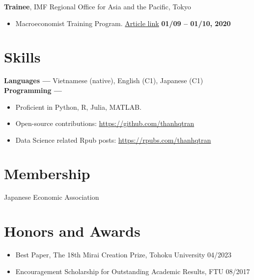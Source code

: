 \documentclass[margin,line]{res}
\begin{document}
\begin{resume}
\vspace*{.05in}
{\bf Trainee}, IMF Regional Office for Asia and the Pacific, Tokyo
\vspace*{.05in}
\begin{itemize}
\item[ ] Macroeconomist Training Program. \href{https://www.imf.org/en/Countries/ResRep/OAP-Home/~/link.aspx?_id=C2F64E8412B64A86BD37DDEB8439312B&_z=z}{Article link} \hfill {\bf 01/09 -- 01/10, 2020}
\end{itemize}

\vspace{4mm}








\section{\sc Skills}
{\bf Languages ---}
\vspace*{.05in}
Vietnamese (native), English (C1), Japanese (C1)\\
{\bf Programming ---}
\vspace*{.05in}
\begin{itemize}
	\item Proficient in Python, R, Julia, MATLAB.
	\item Open-source contributions: \url{https://github.com/thanhqtran}
	\item Data Science related Rpub posts: \url{https://rpubs.com/thanhqtran}
\end{itemize}

\vspace{4mm}

\section{\sc Membership}
 Japanese Economic Association \\

\section{\sc Honors and Awards}
\begin{itemize}
\item[] Best Paper, The 18th Mirai Creation Prize, Tohoku University \hfill 04/2023
\item[] Encouragement Scholarship for Outstanding Academic Results, FTU \hfill 08/2017
\end{itemize}


\end{resume}
\end{document}
